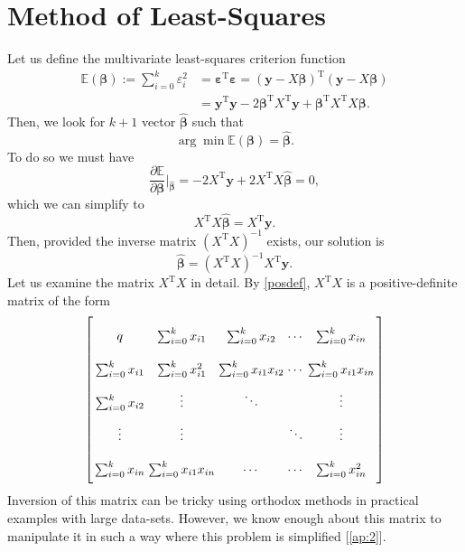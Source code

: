 \documentclass[10pt,a4paper, twocolumn, conference]{IEEEtran}
\theoremstyle{own}
\theoremstyle{definition}
\theoremstyle{plain}
\begin{document}
\section{Method of Least-Squares}
Let us define the multivariate least-squares criterion function
\begin{align} \nonumber
\mathbb{E}(\boldsymbol\beta) := \sum_{i = 0}^k \varepsilon_i^2 & = \boldsymbol\varepsilon^{\text{T}} \boldsymbol\varepsilon = (\mathbf{y} - X \boldsymbol\beta)^{\text{T}} (\mathbf{y} - X \boldsymbol\beta) \\
& = \mathbf{y}^{\text{T}}\mathbf{y} - 2\boldsymbol\beta^{\text{T}}X^{\text{T}}\mathbf{y} + \boldsymbol\beta^{\text{T}}X^{\text{T}} X\boldsymbol\beta.
\end{align}
Then, we look for $k+1$ vector $\hat{\boldsymbol\beta}$ such that
\begin{equation}
\arg \min \mathbb{E} (\boldsymbol\beta) = \hat{\boldsymbol\beta}.
\end{equation}
To do so we must have
\begin{equation}
\frac{\partial \mathbb{E}}{\partial \boldsymbol\beta} \Big|_{\hat{\boldsymbol\beta}} = -2X^{\text{T}}\mathbf{y} + 2 X^{\text{T}} X \hat{\boldsymbol\beta} =  0,
\end{equation}
which we can simplify to
\begin{equation}
X^{\text{T}} X \hat{\boldsymbol\beta} = X^{\text{T}}\mathbf{y}.
\end{equation}
Then, provided the inverse matrix $(X^{\text{T}} X)^{-1}$ exists, our solution is
\begin{equation}
\hat{\boldsymbol\beta} = (X^{\text{T}} X)^{-1} X^{\text{T}}\mathbf{y}.
\end{equation}
Let us examine the matrix $X^{\text{T}} X$ in detail. By \cref{posdef}, $X^{\text{T}} X$ is a positive-definite matrix of the form
\begin{equation*} \arraycolsep=1.4pt\def\arraystretch{2.2}
\left[ \begin{array}{ccccc} q & \sum_{i = 0}^k x_{i1} & \sum_{i = 0}^k x_{i2} & \cdots & \sum_{i = 0}^k x_{in} \\
             \sum_{i = 0}^k x_{i1} & \sum_{i = 0}^k x_{i1}^2 & \sum_{i = 0}^k x_{i1}x_{i2} & \cdots & \sum_{i = 0}^k x_{i1}x_{in} \\
             \sum_{i = 0}^k x_{i2} & \vdots & \ddots & & \vdots\\
             \vdots				   & \vdots &  & \ddots & \vdots \\
             \sum_{i = 0}^k x_{in} & \sum_{i = 0}^k x_{i1}x_{in}  & \cdots & \cdots & \sum_{i = 0}^k x_{in}^2

\end{array} \right]
\end{equation*}
Inversion of this matrix can be tricky using orthodox methods in practical examples with large data-sets. However, we know enough about this matrix to manipulate it in such a way where this problem is simplified [\ref{ap:2}].
\end{document}
